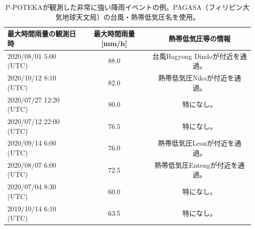\begin{table}[h]
\centering
\begin{tabular}{lcc}
\hline
最大時間雨量の観測日時 & 最大時間雨量[mm/h] & 熱帯低気圧等の情報 \\
\hline \hline
2020/08/01 5:00 (UTC) & 88.0 & 台風Bagyong Dindoが付近を通過。 \\
2020/10/12 8:10 (UTC) & 82.0 & 熱帯低気圧Nikaが付近を通過。 \\
2020/07/27 12:20 (UTC) & 80.0 & 特になし。 \\
2020/07/12 22:00 (UTC) & 76.5 & 特になし。 \\
2020/09/14 6:00 (UTC) & 76.0 & 熱帯低気圧Leonが付近を通過。 \\
2020/08/07 6:00 (UTC) & 72.5 & 熱帯低気圧Entengが付近を通過。 \\
2020/07/04 8:30 (UTC) & 60.0 & 特になし。 \\
2019/10/14 6:10 (UTC) & 63.5 & 特になし。 \\
\hline
\end{tabular}
\caption{P-POTEKAが観測した非常に強い降雨イベントの例。PAGASA（フィリピン大気地球天文局）の台風・熱帯低気圧名を使用。}
\label{tb:poteka-observation-parameters}
\end{table}


